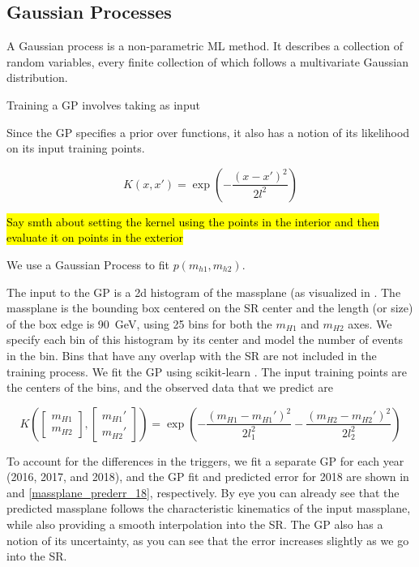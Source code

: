 \subsection{Gaussian Processes}
\label{sec:gps}

A Gaussian process is a non-parametric ML method.
It describes a collection of random variables, every finite collection of which follows a multivariate Gaussian distribution.

Training a GP involves taking as input 

Since the GP specifies a prior over functions, it also has a notion of its likelihood on its input training points.

\begin{equation}
K(x,x') = \exp \left( - \frac{(x - x')^2}{2 l^2} \right)
\end{equation}

\hl{Say smth about setting the kernel using the points in the interior and then evaluate it on points in the exterior}

We use a Gaussian Process to fit $p (m_{h1}, m_{h2})$.


The input to the GP is a 2d histogram of the massplane (as visualized in \Fig{\ref{massplane_obs_18}}. The massplane is the bounding box centered on the SR center and the length (or size) of the box edge is 90~GeV, using 25 bins for both the $m_{H1}$ and $m_{H2}$ axes. We specify each bin of this histogram by its center and model the number of events in the bin. Bins that have any overlap with the SR are not included in the training process. We fit the GP using scikit-learn \cite{scikit-learn}.
The input training points are the centers of the bins, and the observed data that we predict are 

\begin{equation}
K \left(
\begin{bmatrix}
m_{H1} \\
m_{H2}
\end{bmatrix},
\begin{bmatrix}
m_{H1}' \\
m_{H2}'
\end{bmatrix}
\right)
 = \exp\left( - \frac{\left(m_{H1} - m_{H1}' \right)^2}{2 l_1^2} -  \frac{\left(m_{H2} - m_{H2}' \right)^2}{2 l_2^2}  \right)
\end{equation}

To account for the differences in the triggers, we fit a separate GP for each year (2016, 2017, and 2018), and the GP fit and predicted error for 2018 are shown in \Fig{\ref{massplane_pred_18}} and \ref{massplane_prederr_18}, respectively. By eye you can already see that the predicted massplane follows the characteristic kinematics of the input massplane, while also providing a smooth interpolation into the SR. The GP also has a notion of its uncertainty, as you can see that the error increases slightly as we go into the SR. 

